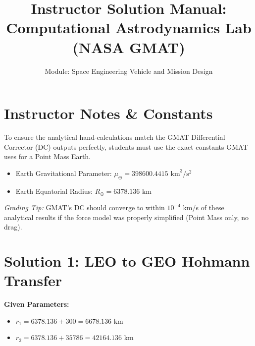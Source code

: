 \documentclass[12pt]{article}
\title{\textbf{Instructor Solution Manual: \\ Computational Astrodynamics Lab (NASA GMAT)}}
\author{Module: Space Engineering Vehicle and Mission Design}
\date{}
\begin{document}
\maketitle

\section*{Instructor Notes \& Constants}
To ensure the analytical hand-calculations match the GMAT Differential Corrector (DC) outputs perfectly, students must use the exact constants GMAT uses for a Point Mass Earth. 
\begin{itemize}
    \item Earth Gravitational Parameter: $\mu_{\oplus} = 398600.4415 \text{ km}^3/\text{s}^2$
    \item Earth Equatorial Radius: $R_{\oplus} = 6378.136 \text{ km}$
\end{itemize}
\textit{Grading Tip:} GMAT's DC should converge to within $10^{-4}$ km/s of these analytical results if the force model was properly simplified (Point Mass only, no drag).

\vspace{0.5cm}

\section*{Solution 1: LEO to GEO Hohmann Transfer}

\textbf{Given Parameters:}
\begin{itemize}
    \item $r_1 = 6378.136 + 300 = 6678.136 \text{ km}$
    \item $r_2 = 6378.136 + 35786 = 42164.136 \text{ km}$
\end{itemize}
\end{document}
